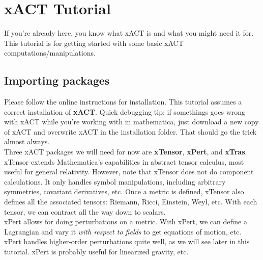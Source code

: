 \documentclass{book}
\theoremstyle{definition}
\begin{document}
   



















\newpage


\section{xACT Tutorial}

If you're already here, you know what xACT is and what you might need it for. This tutorial is for getting started with some basic xACT computations/manipulations.



\subsection{Importing packages}

Please follow the online instructions for installation. This tutorial assumes a correct installation of \textbf{xACT}. Quick debugging tip: if somethings goes wrong with xACT while you're working with in mathematica, just download a new copy of xACT and overwrite xACT in the installation folder. That should go the trick almost always.\\

Three xACT packages we will need for now are \textbf{xTensor}, \textbf{xPert}, and \textbf{xTras}. xTensor extends Mathematica's capabilities in abstract tensor calculus, most useful for general relativity. However, note that xTensor does not do component calculations. It only handles symbol manipulations, including arbitrary symmetries, covariant derivatives, etc. Once a metric is defined, xTensor also defines all the associated tensors: Riemann, Ricci, Einstein, Weyl, etc. With each tensor, we can contract all the way down to scalars. \\

xPert allows for doing perturbations on a metric. With xPert, we can define a Lagrangian and vary it \textit{with respect to fields} to get equations of motion, etc. xPert handles higher-order perturbations quite well, as we will see later in this tutorial. xPert is probably useful for linearized gravity, etc.\\
\end{document}
